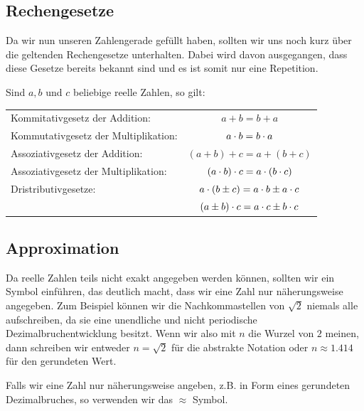 \documentclass[11pt,oneside]{article}
\begin{document}
    \begin{figure}[H]
        \centering
    \end{figure}\vspace{2cm}

\subsection{Rechengesetze}
    Da wir nun unseren Zahlengerade gefüllt haben, sollten wir uns noch kurz über die geltenden Rechengesetze unterhalten. Dabei wird davon ausgegangen, dass  diese Gesetze bereits bekannt sind und es ist somit nur eine Repetition.
    \begin{satz}
        Sind $a,b$ und $c$ beliebige reelle Zahlen, so gilt:
        \begingroup
        \renewcommand{\arraystretch}{1.5}
        \begin{table}[H]
            \begin{tabular}{p{8cm} c}
                Kommitativgesetz der Addition: & $a+b=b+a$ \\
                Kommutativgesetz der Multiplikation: & $a\cdot b=b\cdot a$\\
                Assoziativgesetz der Addition: & $(a+b)+c=a+(b+c)$ \\
                Assoziativgesetz der Multiplikation: & $(a\cdot b)\cdot c=a\cdot(b\cdot c)$ \\
                Dristributivgesetze: & $a\cdot(b\pm c)=a\cdot b\pm a\cdot c$ \\
                & $(a\pm b)\cdot c=a\cdot c\pm b\cdot c$
            \end{tabular}
        \end{table}
        \endgroup
    \end{satz}

\subsection{Approximation}
    Da reelle Zahlen teils nicht exakt angegeben werden können, sollten wir ein Symbol einführen, das deutlich macht, dass wir eine Zahl nur näherungsweise angegeben. Zum Beispiel können wir die Nachkommastellen von $\sqrt{2}$ niemals alle aufschreiben, da sie eine unendliche und nicht periodische Dezimalbruchentwicklung besitzt. Wenn wir also mit $n$ die Wurzel von $2$ meinen, dann schreiben wir entweder $n=\sqrt{2}$ für die abstrakte Notation oder $n\approx 1.414$ für den gerundeten Wert.
    \begin{notation}
        Falls wir eine Zahl nur näherungsweise angeben, z.B. in Form eines gerundeten Dezimalbruches, so verwenden wir das $\approx$ Symbol.
    \end{notation}
\end{document}
